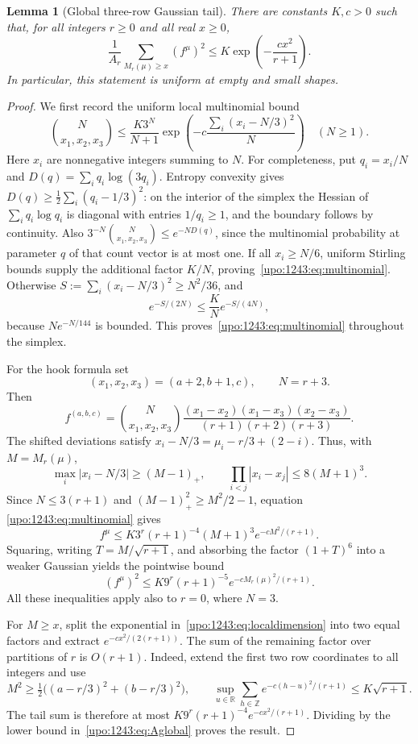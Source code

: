 \documentclass[11pt,letterpaper]{article}
\newtheorem{lemma}[theorem]{Lemma}
\theoremstyle{remark}\newtheorem{remark}[theorem]{Remark}
\numberwithin{equation}{section}
\begin{document}
\begin{lemma}[Global three-row Gaussian tail]\label{upo:1243:lem:tail}
There are constants $K,c>0$ such that, for all integers $r\ge0$ and all
real $x\ge0$,
\begin{equation}\label{upo:1243:eq:tail}
 \frac1{A_r}\sum_{M_r(\mu)\ge x}(f^\mu)^2
 \le K\exp\left(-\frac{cx^2}{r+1}\right).
\end{equation}
In particular, this statement is uniform at empty and small shapes.
\end{lemma}
\begin{proof}
We first record the uniform local multinomial bound
\begin{equation}\label{upo:1243:eq:multinomial}
 \binom{N}{x_1,x_2,x_3}
 \le\frac{K3^N}{N+1}
 \exp\left(-c\frac{\sum_i(x_i-N/3)^2}{N}\right)
 \quad(N\ge1).
\end{equation}
Here $x_i$ are nonnegative integers summing to $N$.
For completeness, put $q_i=x_i/N$ and
$D(q)=\sum_iq_i\log(3q_i)$. Entropy convexity gives
$D(q)\ge\frac12\sum_i(q_i-1/3)^2$: on the interior of the simplex the
Hessian of $\sum_iq_i\log q_i$ is diagonal with entries $1/q_i\ge1$,
and the boundary follows by continuity. Also
$3^{-N}\binom{N}{x_1,x_2,x_3}\le e^{-ND(q)}$, since the multinomial
probability at parameter $q$ of that count vector is at most one.
If all $x_i\ge N/6$, uniform Stirling bounds supply the additional factor
$K/N$, proving~\eqref{upo:1243:eq:multinomial}. Otherwise
$S:=\sum_i(x_i-N/3)^2\ge N^2/36$, and
\[
 e^{-S/(2N)}\le\frac K N e^{-S/(4N)},
\]
because $N e^{-N/144}$ is bounded. This proves~\eqref{upo:1243:eq:multinomial}
throughout the simplex.

For the hook formula set
\[
 (x_1,x_2,x_3)=(a+2,b+1,c),\qquad N=r+3.
\]
Then
\[
 f^{(a,b,c)}=
 \binom{N}{x_1,x_2,x_3}
 \frac{(x_1-x_2)(x_1-x_3)(x_2-x_3)}{(r+1)(r+2)(r+3)}.
\]
The shifted deviations satisfy
$x_i-N/3=\mu_i-r/3+(2-i)$. Thus, with $M=M_r(\mu)$,
\[
 \max_i|x_i-N/3|\ge(M-1)_+,
 \qquad \prod_{i<j}|x_i-x_j|\le8(M+1)^3.
\]
Since $N\le3(r+1)$ and $(M-1)_+^2\ge M^2/2-1$, equation
\eqref{upo:1243:eq:multinomial} gives
\[
 f^\mu\le
 K3^r(r+1)^{-4}(M+1)^3
 e^{-cM^2/(r+1)}.
\]
Squaring, writing $T=M/\sqrt{r+1}$, and absorbing the factor
$(1+T)^6$ into a weaker Gaussian yields the pointwise bound
\begin{equation}\label{upo:1243:eq:localdimension}
 (f^\mu)^2\le K9^r(r+1)^{-5}
 e^{-cM_r(\mu)^2/(r+1)}.
\end{equation}
All these inequalities apply also to $r=0$, where $N=3$.

For $M\ge x$, split the exponential in~\eqref{upo:1243:eq:localdimension}
into two equal factors and extract $e^{-cx^2/(2(r+1))}$.
The sum of the remaining factor over partitions of $r$ is $O(r+1)$.
Indeed, extend the first two row coordinates to all integers and use
\[
 M^2\ge\tfrac12\bigl((a-r/3)^2+(b-r/3)^2\bigr),
 \qquad
 \sup_{u\in\mathbb R}\sum_{h\in\mathbb Z}
 e^{-c(h-u)^2/(r+1)}\le K\sqrt{r+1}.
\]
The tail sum is therefore at most
$K9^r(r+1)^{-4}e^{-cx^2/(r+1)}$.
Dividing by the lower bound in~\eqref{upo:1243:eq:Aglobal} proves the result.
\end{proof}
\end{document}
